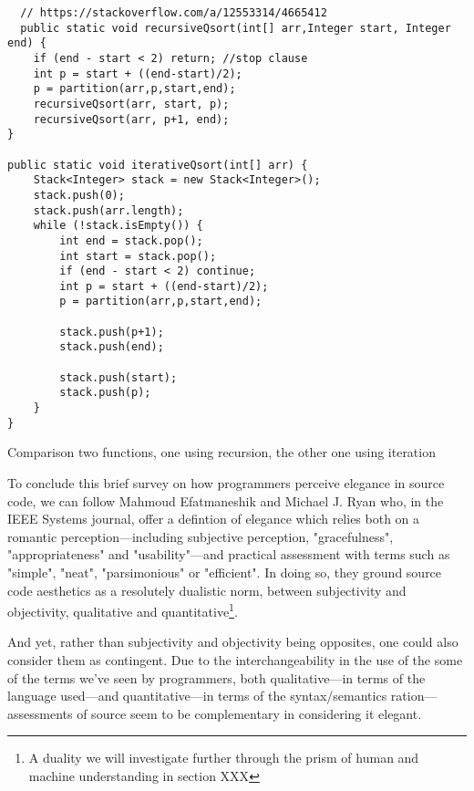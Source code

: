 \begin{listing}
  \begin{verbatim}
  // https://stackoverflow.com/a/12553314/4665412
  public static void recursiveQsort(int[] arr,Integer start, Integer end) { 
    if (end - start < 2) return; //stop clause
    int p = start + ((end-start)/2);
    p = partition(arr,p,start,end);
    recursiveQsort(arr, start, p);
    recursiveQsort(arr, p+1, end);
}

public static void iterativeQsort(int[] arr) { 
    Stack<Integer> stack = new Stack<Integer>();
    stack.push(0);
    stack.push(arr.length);
    while (!stack.isEmpty()) {
        int end = stack.pop();
        int start = stack.pop();
        if (end - start < 2) continue;
        int p = start + ((end-start)/2);
        p = partition(arr,p,start,end);

        stack.push(p+1);
        stack.push(end);

        stack.push(start);
        stack.push(p);
    }
}
\end{verbatim}
  \caption{Comparison two functions, one using recursion, the other one using iteration}
  \label{code:recursion_iteration_csharp}
\end{listing}

To conclude this brief survey on how programmers perceive elegance in source code, we can follow Mahmoud Efatmaneshik and Michael J. Ryan who, in the IEEE Systems journal, offer a defintion of elegance which relies both on a romantic perception—including subjective perception, "gracefulness", "appropriateness" and "usability"—and practical assessment with terms such as "simple", "neat", "parsimonious" or "efficient"\cite{efatmaneshnik_definitions_2019}. In doing so, they ground source code aesthetics as a resolutely dualistic norm, between subjectivity and objectivity, qualitative and quantitative\footnote{A duality we will investigate further through the prism of human and machine understanding in section XXX}.


And yet, rather than subjectivity and objectivity being opposites, one could also consider them as contingent. Due to the interchangeability in the use of the some of the terms we've seen by programmers, both qualitative—in terms of the language used—and quantitative—in terms of the syntax/semantics ration—assessments of source seem to be complementary in considering it elegant.

